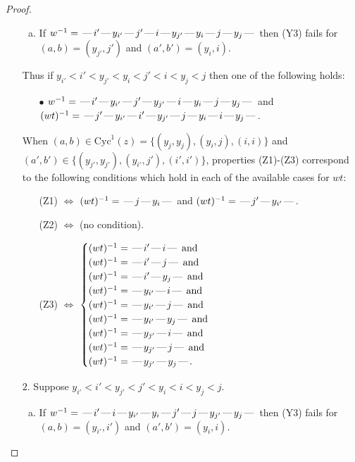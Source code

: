 \documentclass[10pt]{article}
\theoremstyle{definition}
\theoremstyle{definition}
\def\dash{\text{\hspace{0.5mm}---\hspace{0.5mm}}}
\def\Cyc{\mathrm{Cyc}}
\begin{document}
\begin{proof}
\begin{enumerate}
\begin{enumerate}[(a)]
\item If $w^{-1} = \dash i'\dash y_{i'}\dash j'\dash i\dash y_{j'}\dash y_i\dash j\dash y_j\dash $ then (Y3) fails for $(a,b)=(y_{j'},j')$ and $(a',b')=(y_i,i)$.
\end{enumerate}
Thus if $y_{i'} < i' < y_{j'} < y_i < j' < i < y_j < j$ then one of the following holds:
\begin{enumerate}
\item[$\bullet$] $w^{-1} = \dash i'\dash y_{i'}\dash j'\dash y_{j'}\dash i\dash y_i\dash j\dash y_j\dash $ and $(wt)^{-1} = \dash j'\dash y_{i'}\dash i'\dash y_{j'}\dash j\dash y_i\dash i\dash y_j\dash $.
\end{enumerate}
When $(a,b)\in\Cyc^1(z)=\{(y_j,y_j),(y_i,j),(i,i)\}$ and $(a',b')\in\{(y_{j'},y_{j'}),(y_{i'},j'),(i',i')\}$,
properties (Z1)-(Z3) correspond to the following conditions which
hold in each of the available cases for $wt$:
\begin{enumerate}
\item[](Z1) $\Leftrightarrow$ $(wt)^{-1} = \dash j \dash y_i \dash$  and $(wt)^{-1} = \dash j' \dash y_{i'} \dash$.
\item[](Z2) $\Leftrightarrow$ (no condition).
\item[](Z3) $\Leftrightarrow$ $\begin{cases}\text{$(wt)^{-1} = \dash i' \dash i \dash$}\text{ and }\\
\text{$(wt)^{-1} = \dash i' \dash j \dash$}\text{ and }\\
\text{$(wt)^{-1} = \dash i' \dash y_j \dash$}\text{ and }\\
\text{$(wt)^{-1} = \dash y_{i'} \dash i \dash$}\text{ and }\\
\text{$(wt)^{-1} = \dash y_{i'} \dash j \dash$}\text{ and }\\
\text{$(wt)^{-1} = \dash y_{i'} \dash y_j \dash$}\text{ and }\\
\text{$(wt)^{-1} = \dash y_{j'} \dash i \dash$}\text{ and }\\
\text{$(wt)^{-1} = \dash y_{j'} \dash j \dash$}\text{ and }\\
\text{$(wt)^{-1} = \dash y_{j'} \dash y_j \dash$}.\end{cases}$
\end{enumerate}
\item[$2$.] Suppose $y_{i'} < i' < y_{j'} < j' < y_i < i < y_j < j$.
\begin{enumerate}[(a)]
\item If $w^{-1} = \dash i'\dash i\dash y_{i'}\dash y_i\dash j'\dash j\dash y_{j'}\dash y_j\dash $ then (Y3) fails for $(a,b)=(y_{i'},i')$ and $(a',b')=(y_i,i)$.

\end{enumerate}
\end{enumerate}
\end{proof}
\end{document}
